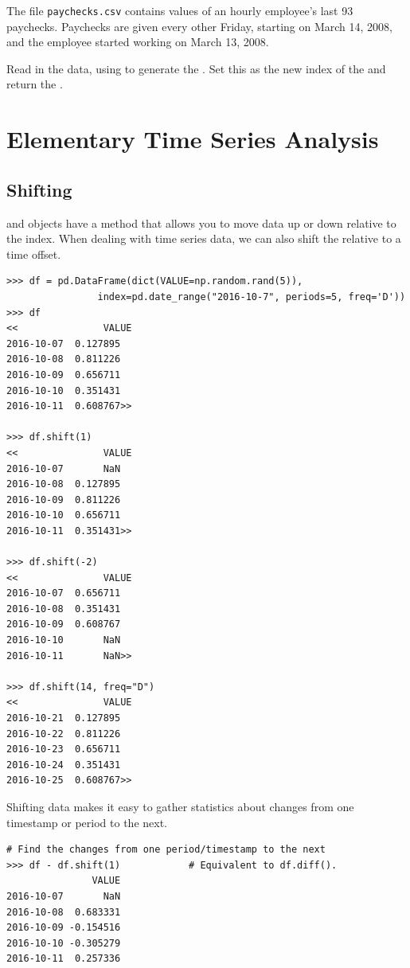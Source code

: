 \begin{problem} %
The file \texttt{paychecks.csv} contains values of an hourly employee's last 93 paychecks.
Paychecks are given every other Friday, starting on March 14, 2008, and the employee started working on March 13, 2008.

Read in the data, using  to generate the .
Set this as the new index of the  and return the .
\end{problem}

\section*{Elementary Time Series Analysis}
\subsection*{Shifting}

 and  objects have a  method that allows you to move data up or down relative to the index.
When dealing with time series data, we can also shift the  relative to a time offset.

\begin{lstlisting}
>>> df = pd.DataFrame(dict(VALUE=np.random.rand(5)),
                index=pd.date_range("2016-10-7", periods=5, freq='D'))
>>> df
<<               VALUE
2016-10-07  0.127895
2016-10-08  0.811226
2016-10-09  0.656711
2016-10-10  0.351431
2016-10-11  0.608767>>

>>> df.shift(1)
<<               VALUE
2016-10-07       NaN
2016-10-08  0.127895
2016-10-09  0.811226
2016-10-10  0.656711
2016-10-11  0.351431>>

>>> df.shift(-2)
<<               VALUE
2016-10-07  0.656711
2016-10-08  0.351431
2016-10-09  0.608767
2016-10-10       NaN
2016-10-11       NaN>>

>>> df.shift(14, freq="D")
<<               VALUE
2016-10-21  0.127895
2016-10-22  0.811226
2016-10-23  0.656711
2016-10-24  0.351431
2016-10-25  0.608767>>
\end{lstlisting}

Shifting data makes it easy to gather statistics about changes from one timestamp or period to the next.

\begin{lstlisting}
# Find the changes from one period/timestamp to the next
>>> df - df.shift(1)            # Equivalent to df.diff().
               VALUE
2016-10-07       NaN
2016-10-08  0.683331
2016-10-09 -0.154516
2016-10-10 -0.305279
2016-10-11  0.257336
\end{lstlisting}

